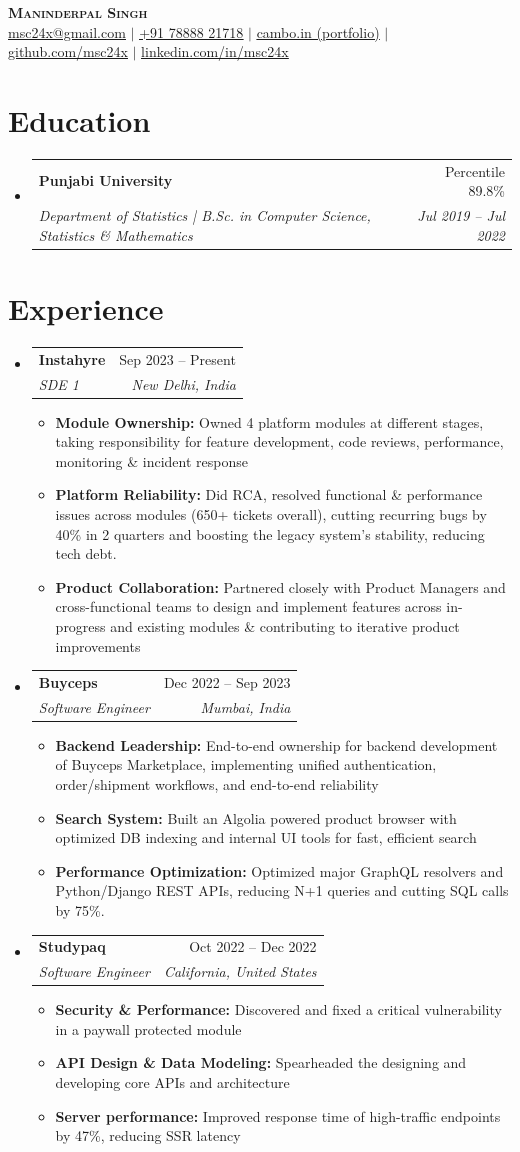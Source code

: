 \documentclass[letterpaper,11pt]{article}
\makeatletter
\newcommand{\resumeItem}[1]{
  \item\small{
    {#1 \vspace{-2pt}}
  }
}
\newcommand{\resumeSubheading}[4]{
  \vspace{-2pt}\item
    \begin{tabular*}{0.97\textwidth}[t]{l@{\extracolsep{\fill}}r}
      \textbf{#1} & #2 \\
      \textit{\small#3} & \textit{\small #4} \\
    \end{tabular*}\vspace{-7pt}
}
\newcommand{\resumeSubHeadingListStart}{\begin{itemize}[leftmargin=0.15in, label={}]}
\newcommand{\resumeSubHeadingListEnd}{\end{itemize}}
\newcommand{\resumeItemListStart}{\begin{itemize}}
\newcommand{\resumeItemListEnd}{\end{itemize}\vspace{-5pt}}
\makeatother
\begin{document}
\begin{center}
    \textbf{\Huge \scshape Maninderpal Singh} \\ \vspace{1pt}
    \href{mailto:msc24x@gmail.com}{\underline{msc24x@gmail.com}} $|$
    \href{tel:+91 78888 21718}{\underline{+91 78888 21718}} $|$
    \href{https://cambo.in}{\underline{cambo.in (portfolio)}} $|$
    \href{https://github.com/msc24x}{\underline{github.com/msc24x}} $|$
    \href{https://linkedin.com/in/msc24x}{\underline{linkedin.com/in/msc24x}}
\end{center}

\section{Education}
  \resumeSubHeadingListStart
    \resumeSubheading{Punjabi University}{Percentile 89.8\%}
      {Department of Statistics | B.Sc. in Computer Science, Statistics \& Mathematics}{Jul 2019 -- Jul 2022}
  \resumeSubHeadingListEnd

\section{Experience}
  \resumeSubHeadingListStart
  \resumeSubheading{Instahyre}{Sep 2023 -- Present}
    {SDE 1}{New Delhi, India}
    \resumeItemListStart
      \resumeItem{\textbf{Module Ownership:} Owned 4 platform modules at different stages, taking responsibility for feature development, code reviews, performance, monitoring \& incident response}
      \resumeItem{\textbf{Platform Reliability:} Did RCA, resolved functional \& performance issues across modules (650+ tickets overall), cutting recurring bugs by 40\% in 2 quarters and boosting the legacy system’s stability, reducing tech debt.}
      \resumeItem{\textbf{Product Collaboration:} Partnered closely with Product Managers and cross-functional teams to design and implement features across in-progress and existing modules \& contributing to iterative product improvements}
    \resumeItemListEnd
  \resumeSubheading{Buyceps}{Dec 2022 -- Sep 2023}
    {Software Engineer}{Mumbai, India}
    \resumeItemListStart
      \resumeItem{\textbf{Backend Leadership:} End-to-end ownership for backend development of Buyceps Marketplace, implementing unified authentication, order/shipment workflows, and end-to-end reliability}
      \resumeItem{\textbf{Search System:} Built an Algolia powered product browser with optimized DB indexing and internal UI tools for fast, efficient search}
      \resumeItem{\textbf{Performance Optimization:} Optimized major GraphQL resolvers and Python/Django REST APIs, reducing N+1 queries and cutting SQL calls by 75\%.}
    \resumeItemListEnd
  \resumeSubheading{Studypaq}{Oct 2022 -- Dec 2022}
    {Software Engineer}{California, United States}
    \resumeItemListStart
      \resumeItem{\textbf{Security \& Performance:} Discovered and fixed a critical vulnerability in a paywall protected module}
      \resumeItem{\textbf{API Design \& Data Modeling:} Spearheaded the designing and developing core APIs and architecture}
      \resumeItem{\textbf{Server performance:} Improved response time of high-traffic endpoints by 47\%, reducing SSR latency}
    \resumeItemListEnd
  \resumeSubHeadingListEnd
\end{document}
